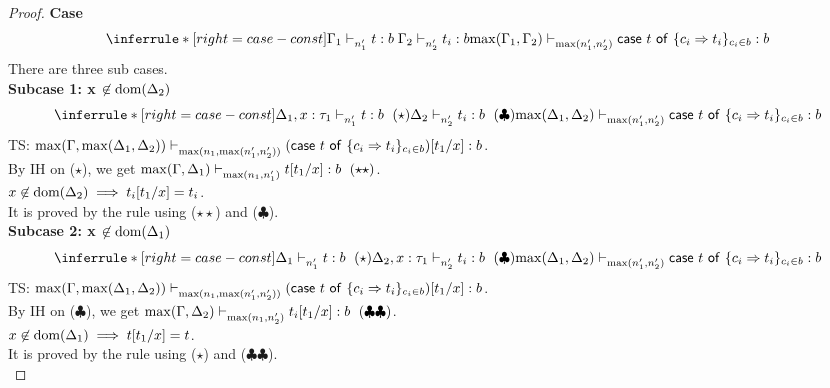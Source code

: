 \documentclass{article}
\begin{document}
\begin{proof}
\noindent \textbf{Case} 
\[
    \inferrule*[ right = case-const ]
   {\Gamma_1 \jtype{n_1'}{}{t}{b} \\ \Gamma_2 \jtype{n_2'}{}{t_i}{b} }
   {\max(\Gamma_1, \Gamma_2) \jtype{\max(n_1',n_2')}{}{\tcaseof{t}\ \{c_i \Rightarrow t_i\}_{c_i \in b} } {b} }
\]
There are three sub cases.\\

\textbf{Subcase 1: x $\not \in \text{dom}(\Delta_2)$ }
\[
   \inferrule*[ right = case-const ]
   {\Delta_1, x: \tau_1 \jtype{n_1'}{}{t}{b}~(\star) \\ \Delta_2 \jtype{n_2'}{}{t_i}{b}~(\clubsuit) }
   {\max(\Delta_1, \Delta_2) \jtype{\max(n_1',n_2')}{}{\tcaseof{t}\ \{c_i \Rightarrow t_i\}_{c_i \in b} } {b} }
\]
 TS: $ \max(\Gamma, \max(\Delta_1,\Delta_2) ) \mathrel{\vdash_{\max(n_1,\max(n_1',n_2') )}^{} {  (\mathsf{case}~t~\mathsf{of}\ \{c_i \Rightarrow t_i\}_{c_i \in b})[t_1/x] } : {b}}  $. \\
 By IH on ($\star$), we get $\max(\Gamma, \Delta_1) \jtype{\max(n_1,n_1') }{}{t[t_1/x]}{b}~(\star\star) $. \\
 $x \not \in \text{dom}(\Delta_2) \implies t_i[t_1/x] =  t_i$.\\
 It is proved by the rule  using ($\star\star$) and ($\clubsuit$). \\

\textbf{Subcase 2: x $\not \in \text{dom}(\Delta_1)$ }
\[
     \inferrule*[ right = case-const ]
   {\Delta_1 \jtype{n_1'}{}{t}{b}~(\star) \\ \Delta_2, x: \tau_1 \jtype{n_2'}{}{t_i}{b}~(\clubsuit) }
   {\max(\Delta_1, \Delta_2) \jtype{\max(n_1',n_2')}{}{\tcaseof{t}\ \{c_i \Rightarrow t_i\}_{c_i \in b} } {b} }
\]
 TS: $ \max(\Gamma, \max(\Delta_1,\Delta_2) ) \mathrel{\vdash_{\max(n_1,\max(n_1',n_2') )}^{} {  (\mathsf{case}~t~\mathsf{of}\ \{c_i \Rightarrow t_i\}_{c_i \in b})[t_1/x] } : {b}}  $. \\
By IH on ($\clubsuit$), we get $\max(\Gamma, \Delta_2) \mathrel{\vdash_{\max(n_1,n_2') }^{} {t_i[t_1/x]} : {b}}~(\clubsuit\clubsuit) $. \\
 $x \not \in \text{dom}(\Delta_1) \implies t[t_1/x] = t $.\\
It is proved by the rule  using ($\star$) and ($\clubsuit\clubsuit$). \\


\end{proof}
\end{document}
